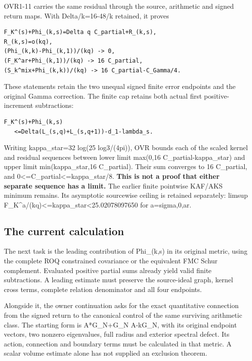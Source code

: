\documentclass[
]{article}
\begin{document}
OVR1-11 carries the same residual through the source, arithmetic and
signed return maps. With Delta/k=16-48/k retained, it proves

\begin{verbatim}
F_K^(s)+Phi_(k,s)=Delta q C_partial+R_(k,s),
R_(k,s)=o(kq),
(Phi_(k,k)-Phi_(k,1))/(kq) -> 0,
(F_K^ar+Phi_(k,1))/(kq) -> 16 C_partial,
(S_k^mix+Phi_(k,k))/(kq) -> 16 C_partial-C_Gamma/4.
\end{verbatim}

These statements retain the two unequal signed finite error endpoints
and the original Gamma correction. The finite cap retains both actual
first positive-increment subtractions:

\begin{verbatim}
F_K^(s)+Phi_(k,s)
   <=Delta(L_(s,q)+L_(s,q+1))-d_1-lambda_s.
\end{verbatim}

Writing kappa\_star=32 log(25 log3/(4pi)), OVR bounds each of the scaled
kernel and residual sequences between lower limit max(0,16
C\_partial-kappa\_star) and upper limit min(kappa\_star,16 C\_partial).
Their sum converges to 16 C\_partial, and
0\textless=C\_partial\textless=kappa\_star/8. \textbf{This is not a
proof that either separate sequence has a limit.} The earlier finite
pointwise KAF/AKS minimum remains. Its asymptotic sourcewise ceiling is
retained separately: limsup
F\_K\^{}a/(kq)\textless=kappa\_star\textless25.02078097650 for
a=sigma,0,ar.

\subsection{The current calculation}\label{the-current-calculation}

The next task is the leading contribution of Phi\_(k,s) in its original
metric, using the complete ROQ constrained covariance or the equivalent
FMC Schur complement. Evaluated positive partial sums already yield
valid finite subtractions. A leading estimate must preserve the
source-ideal graph, kernel cross terms, complete relation denominator
and all four endpoints.

Alongside it, the owner continuation asks for the exact quantitative
connection from the signed return to the canonical control of the same
surviving arithmetic class. The starting form is A*G\_N+G\_N A-kG\_N,
with its original endpoint vectors, two nonzero eigenvalues, full radius
and exterior spectral defect. Its action, connection and boundary terms
must be calculated in that metric. A scalar volume estimate alone has
not supplied an exclusion theorem.
\end{document}
